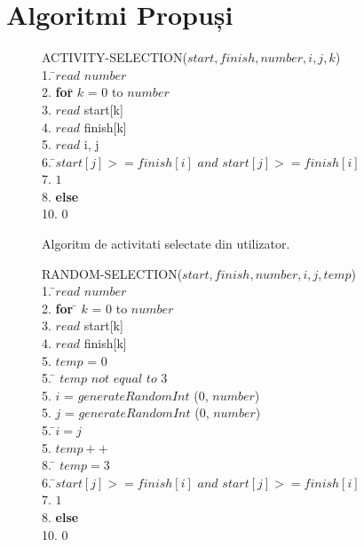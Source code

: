 \documentclass[12pt]{article}
\begin{document}
{\section{Algoritmi Propuși}

\begin{figure}[h]
\begin{center}
\begin{tabbing}
ACTIVITY-SELECTION($start, finish, number, i, j, k$) \\
1. \indent 			  \=$read$ $number$ \\
2. \indent            \> {\bf for}\= $k$ = $0$ to $number$ \\
3. \indent            \>			\>$read$ start[k] \\
4. \indent            \>			\>$read$ finish[k] \\
5. \indent            \> $read$ i, j \\
6. \indent            {} \=$start[j] >= finish[i]$ $and$ $start[j] >= finish[i]$ \\
7. \indent            \>             $1$ \\
8. \indent            \> {\bf else}  \\
10.\indent           \>				 $0$ \\

\end{tabbing}
\caption{Algoritm de activitati selectate din utilizator.}
\label{fig_alg_ex}
\end{center}
\end{figure}
\begin{figure}[h]
\begin{center}
\begin{tabbing}
RANDOM-SELECTION($start, finish, number, i, j, temp$) \\
1. \indent 			  \=$read$ $number$ \\
2. \indent            \> {\bf for }\= $k$ = $0$ to $number$ \\
3. \indent            \>			\>$read$ start[k] \\
4. \indent            \>			\>$read$ finish[k] \\
5. \indent			  \>$temp$ = $0$\\
5. \indent			  {} \= $temp$ $not$ $equal$ $to$ $3$\\
5. \indent            \>			\>$i$ = $generateRandomInt$ ($0$, $number$)\\
5. \indent            \>			\>$j$ = $generateRandomInt$ ($0$, $number$)\\
5. \indent            \>			 \=$i = j$\\
5. \indent            \>			\>				\>$temp++$\\
8. \indent            \>             \= $temp = 3$ \\
6. \indent            {} \=$start[j] >= finish[i]$ $and$ $start[j] >= finish[i]$ \\
7. \indent            \>             $1$ \\
8. \indent            \> {\bf else}  \\
10.\indent           \>				 $0$ \\


\end{tabbing}
\end{center}
\end{figure}}
\end{document}

